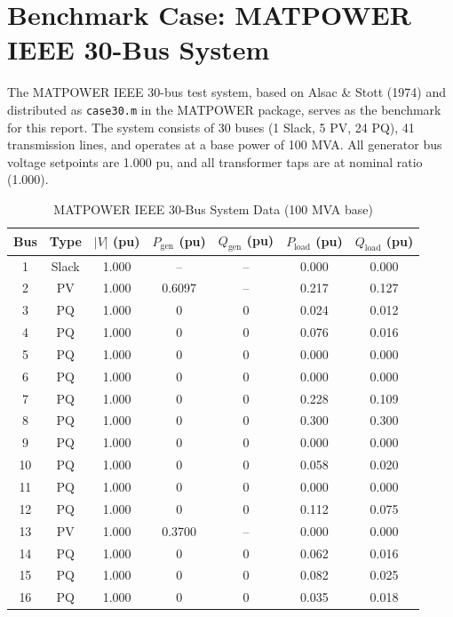 \documentclass[12pt,a4paper]{article}
\begin{document}
\section{Benchmark Case: MATPOWER IEEE 30-Bus System}

The MATPOWER IEEE 30-bus test system, based on Alsac \& Stott (1974) and distributed as \texttt{case30.m} in the MATPOWER package, serves as the benchmark for this report. The system consists of 30 buses (1 Slack, 5 PV, 24 PQ), 41 transmission lines, and operates at a base power of 100 MVA. All generator bus voltage setpoints are 1.000 pu, and all transformer taps are at nominal ratio (1.000).

\begin{table}[H]
\centering
\caption{MATPOWER IEEE 30-Bus System Data (100 MVA base)}
\footnotesize
\begin{tabular}{ccccccc}
\toprule
\textbf{Bus} & \textbf{Type} & \textbf{$|V|$ (pu)} & \textbf{$P_{\text{gen}}$ (pu)} & \textbf{$Q_{\text{gen}}$ (pu)} & \textbf{$P_{\text{load}}$ (pu)} & \textbf{$Q_{\text{load}}$ (pu)} \\
\midrule
1  & Slack & 1.000 & -- & -- & 0.000 & 0.000 \\
2  & PV    & 1.000 & 0.6097 & -- & 0.217 & 0.127 \\
3  & PQ    & 1.000 & 0     & 0   & 0.024 & 0.012 \\
4  & PQ    & 1.000 & 0     & 0   & 0.076 & 0.016 \\
5  & PQ    & 1.000 & 0     & 0   & 0.000 & 0.000 \\
6  & PQ    & 1.000 & 0     & 0   & 0.000 & 0.000 \\
7  & PQ    & 1.000 & 0     & 0   & 0.228 & 0.109 \\
8  & PQ    & 1.000 & 0     & 0   & 0.300 & 0.300 \\
9  & PQ    & 1.000 & 0     & 0   & 0.000 & 0.000 \\
10 & PQ    & 1.000 & 0     & 0   & 0.058 & 0.020 \\
11 & PQ    & 1.000 & 0     & 0   & 0.000 & 0.000 \\
12 & PQ    & 1.000 & 0     & 0   & 0.112 & 0.075 \\
13 & PV    & 1.000 & 0.3700 & -- & 0.000 & 0.000 \\
14 & PQ    & 1.000 & 0     & 0   & 0.062 & 0.016 \\
15 & PQ    & 1.000 & 0     & 0   & 0.082 & 0.025 \\
16 & PQ    & 1.000 & 0     & 0   & 0.035 & 0.018 \\

\end{tabular}
\end{table}
\end{document}
